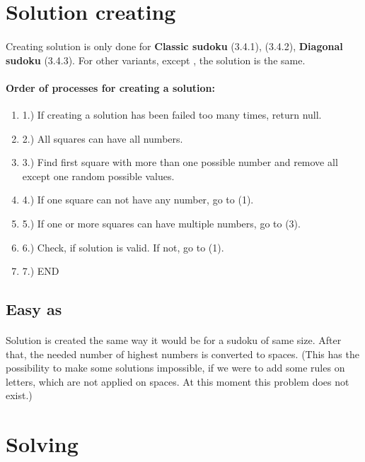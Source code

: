 \documentclass{report}
\begin{document}
\section{Solution creating}

\paragraph{}
Creating solution is only done for \textbf{Classic sudoku} (3.4.1),  (3.4.2), \textbf{Diagonal sudoku} (3.4.3). For other variants, except , the solution is the same.

\paragraph{Order of processes for creating a solution:}
\begin{enumerate}
    \item[] 1.) If creating a solution has been failed too many times, return null.
    \item[] 2.) All squares can have all numbers.
    \item[] 3.) Find first square with more than one possible number and remove all except one random possible values.
    \item[] 4.) If one square can not have any number, go to (1).
    \item[] 5.) If one or more squares can have multiple numbers, go to (3).
    \item[] 6.) Check, if solution is valid. If not, go to (1).
    \item[] 7.) END
\end{enumerate}

\subsection{Easy as}

\paragraph{}
Solution is created the same way it would be for a sudoku of same size. After that, the needed number of highest numbers is converted to spaces. (This has the possibility to make some solutions impossible, if we were to add some rules on letters, which are not applied on spaces. At this moment this problem does not exist.)

\section{Solving}
\end{document}
